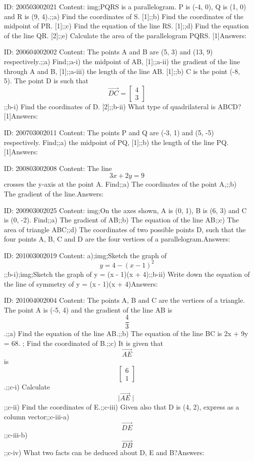 \documentclass{article}
\begin{document}
ID: 200503002021
Content:
img;PQRS is a parallelogram. P is (-4, 0), Q is (1, 0) and R is (9, 4).;;a) Find the coordinates of S. [1];;b) Find the coordinates of the midpoint of PR. [1];;c) Find the equation of the line RS. [1];;d) Find the equation of the line QR. [2];;e) Calculate the area of the parallelogram PQRS. [1]Answers:

ID: 200604002002
Content:
The points A and B are (5, 3) and (13, 9) respectively.;;a) Find;;a-i) the midpoint of AB, [1];;a-ii) the gradient of the line through A and B, [1];;a-iii) the length of the line AB. [1];;b) C is the point (-8, 5). The point D is such that $$\vec{DC}=\begin{bmatrix}4\\3\end{bmatrix}$$;;b-i) Find the coordinates of D. [2];;b-ii) What type of quadrilateral is ABCD? [1]Answers:

ID: 200703002011
Content:
The points P and Q are (-3, 1) and (5, -5) respectively. Find;;a) the midpoint of PQ, [1];;b) the length of the line PQ. [1]Answers:

ID: 200803002008
Content:
The line $$3x + 2y = 9$$ crosses the y-axis at the point A. Find;;a) The coordinates of the point A,;;b) The gradient of the line.Answers:

ID: 200903002025
Content:
img;On the axes shown, A is (0, 1), B is (6, 3) and C is (0, -2). Find;;a) The gradient of AB;;b) The equation of the line AB;;c) The area of triangle ABC;;d) The coordinates of two possible points D, such that the four points A, B, C and D are the four vertices of a parallelogram.Answers:

ID: 201003002019
Content:
a);img;Sketch the graph of $$y = 4 - (x - 1) ^2$$;;b-i);img;Sketch the graph of y = (x - 1)(x + 4);;b-ii) Write down the equation of the line of symmetry of y = (x - 1)(x + 4)Answers:

ID: 201004002004
Content:
The points A, B and C are the vertices of a triangle. The point A is (-5, 4) and the gradient of the line AB is $$\frac{4}{3}$$.;;a) Find the equation of the line AB.;;b) The equation of the line BC is 2x + 9y = 68. ; Find the coordinated of B.;;c) It is given that $$\vec{AE}$$ is $$\begin{bmatrix}6\\1\end{bmatrix}$$.;;c-i) Calculate $$\mid\vec{AE}\mid$$;;c-ii) Find the coordinates of E.;;c-iii) Given also that D is (4, 2), express as a column vector;;c-iii-a) $$\vec{DE}$$;;c-iii-b) $$\vec{DB}$$;;c-iv) What two facts can be deduced about D, E and B?Answers:
\end{document}
